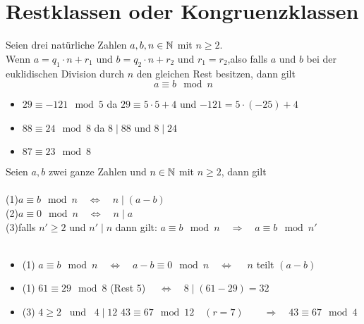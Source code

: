 \documentclass[../MAIN/main.tex]{subfiles}
\begin{document}
	\section{Restklassen oder Kongruenzklassen}

\begin{Definition}
Seien drei natürliche Zahlen $a, b, n \in \mathbb{N}$ mit $n\geq 2$.\\ Wenn $a=q_{1} \cdot n + r_{1}$  \qquad und \qquad  $b=q_{2} \cdot n + r_{2}$ \qquad und \quad $r_{1}=r_{2}$,\qquad also falls $a$ und $b$ bei der euklidischen Division durch $n$ den gleichen Rest besitzen, dann gilt
$$a \equiv b\mod n$$
\end{Definition}

\begin{Beispiel}
\begin{itemize}
\item $29\equiv-121 \mod 5 $ \quad da $29 \equiv 5\cdot 5 +4$ \quad und \quad $-121 = 5\cdot (-25) +4$
\item $88\equiv 24 \mod 8 $ \quad da $8\mid 88$ \quad und \quad $8\mid 24$
\item $87\equiv 23 \mod 8$ \\
\end{itemize}
\end{Beispiel}

\begin{Theorem}
Seien $a,b$ zwei ganze Zahlen und $n\in\mathbb{N}$ mit $n\geq 2$, dann gilt\\\\
(1)\qquad $ a\equiv b \mod n \quad \Leftrightarrow \quad n\mid (a-b)$\\
(2)\qquad $ a\equiv 0 \mod n \quad\Leftrightarrow\quad n\mid a$\\
(3)\qquad falls $n'\geq 2$ und $n'\mid n$ dann gilt: \quad $a \equiv b \mod n \quad \Rightarrow \quad a \equiv b \mod n' $\\\\
\end{Theorem}

\begin{Beweis}
\begin{itemize}
\item (1) \quad $ a \equiv b \mod n \quad\Leftrightarrow\quad a - b \equiv 0 \mod n \quad\Leftrightarrow\quad $ $n$ teilt $(a-b)$
\end{itemize}
\end{Beweis}

\begin{Beispiel}
\begin{itemize}
\item (1) \quad $61 \equiv 29 \mod 8$ \quad (Rest 5) $\quad\Leftrightarrow\quad 8\mid  (61-29) = 32 $
\item (3) \quad $4 \geq 2$ \, und \, $4\mid 12$ \quad $43 \equiv 67 \mod 12 \quad(r=7)\qquad \Rightarrow \quad 43 \equiv 67 \mod 4  $ \\
\end{itemize}
\end{Beispiel}
\end{document}
